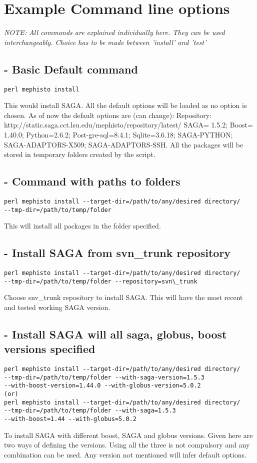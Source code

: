 \documentclass[a4paper,10pt]{article}
\begin{document}
\section*{Example Command line options}
\emph{NOTE: All commands are explained individually here. They can be used interchangeably.
Choice has to be made between 'install' and 'test'}
\subsection*{- Basic Default command}
\begin{verbatim}
perl mephisto install 
\end{verbatim}
This would install SAGA. All the default options will be loaded as no
option is chosen. As of now the default options are (can change):
Repository: http://static.saga.cct.lsu.edu/mephisto/repository/latest/
SAGA= 1.5.2;
Boost= 1.40.0;
Python=2.6.2;
Post-gre-sql=8.4.1;
Sqlite=3.6.18;
SAGA-PYTHON;
SAGA-ADAPTORS-X509;
SAGA-ADAPTORS-SSH.
All the packages will be stored in temporary folders created by the script.
\subsection*{- Command with paths to folders}
\begin{verbatim}
perl mephisto install --target-dir=/path/to/any/desired directory/ 
--tmp-dir=/path/to/temp/folder 
\end{verbatim}
This will install all packages in the folder specified. 
\subsection*{- Install SAGA from svn\_trunk repository}
\begin{verbatim}
perl mephisto install --target-dir=/path/to/any/desired directory/ 
--tmp-dir=/path/to/temp/folder --repository=svn\_trunk
\end{verbatim}
Choose snv\_trunk repository to install SAGA. This will have the most
recent and tested working SAGA version. 
\subsection*{- Install SAGA will all saga, globus, boost versions specified}
\begin{verbatim}
perl mephisto install --target-dir=/path/to/any/desired directory/ 
--tmp-dir=/path/to/temp/folder --with-saga-version=1.5.3 
--with-boost-version=1.44.0 --with-globus-version=5.0.2
(or)
perl mephisto install --target-dir=/path/to/any/desired directory/ 
--tmp-dir=/path/to/temp/folder --with-saga=1.5.3 
--with-boost=1.44 --with-globus=5.0.2
\end{verbatim}
To install SAGA with different boost, SAGA and globus versions.
Given here are two ways of defining the versions. Using all the three 
is not compulsory and any combination can be used. Any version 
not mentioned will infer default options. 
\end{document}
